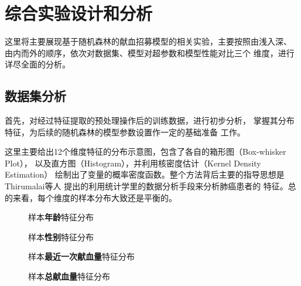 \documentclass[main.tex]{subfiles}
\begin{document}
\section{综合实验设计和分析}
这里将主要展现基于随机森林的献血招募模型的相关实验，主要按照由浅入深、
由内而外的顺序，依次对数据集、模型对超参数和模型性能对比三个
维度，进行详尽全面的分析。

\subsection{数据集分析}
首先，对经过特征提取的预处理操作后的训练数据，进行初步分析，
掌握其分布特征，为后续的随机森林的模型参数设置作一定的基础准备
工作。

这里主要给出12个维度特征的分布示意图，包含了各自的箱形图（Box-whisker Plot），
以及直方图（Histogram），并利用核密度估计（Kernel Density Estimation）
绘制出了变量的概率密度函数。整个方法背后主要的指导思想是Thirumalai等人
\cite{8245071}提出的利用统计学里的数据分析手段来分析肺癌患者的
特征。总的来看，每个维度的样本分布大致还是平衡的。

\begin{figure}[htbp!]
    \centering 
    \caption{样本\textbf{年龄}特征分布}
    \label{age_dis}
\end{figure}

\begin{figure}[htbp!]
    \centering 
    \caption{样本\textbf{性别}特征分布}
    \label{sex_dis}
\end{figure}

\begin{figure}[htbp!]
    \centering 
    \caption{样本\textbf{最近一次献血量}特征分布}
    \label{last_volume_dis}
\end{figure}

\begin{figure}[htbp!]
    \centering 
    \caption{样本\textbf{总献血量}特征分布}
    \label{total_volume_dis}
\end{figure}
\end{document}
